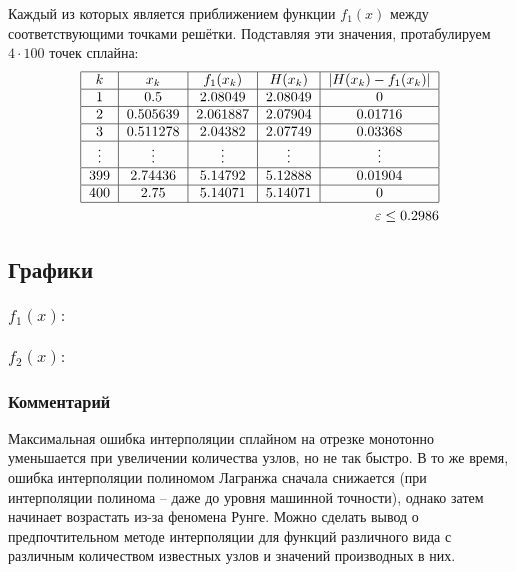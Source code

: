 Каждый из которых является приближением функции $f_1(x)$ между соответствующими точками решётки. Подставляя эти значения, протабулируем $4\cdot100$ точек сплайна:
\begin{align}
    \begin{tabular}{|c|c|c|c|c|}
        \hline
        $k$ & $x_k$ & $f_1(x_k)$ & $H(x_k)$ & $|H(x_k)-f_1(x_k)|$ \\
        \hline
        1 & 0.5      & 2.08049 & 2.08049 & 0 \\
        \hline
        2 & 0.505639 & 2.061887& 2.07904 &  0.01716 \\
        \hline
        3 & 0.511278 & 2.04382 & 2.07749 &  0.03368 \\
        \hline
        $\vdots$ & $\vdots$ & $\vdots$ & $\vdots$ &  $\vdots$ \\
        \hline
        399 & 2.74436   & 5.14792 &	5.12888 &  0.01904 \\
        \hline
        400 & 2.75 & 5.14071  & 5.14071 &  0\\
        \hline
    \end{tabular}\\
    \varepsilon \le 0.2986
\end{align}

\subsection{Графики}

\subsubsection{$f_1(x):$}


\subsubsection{$f_2(x):$}


\subsubsection*{Комментарий}
Максимальная ошибка интерполяции сплайном на отрезке монотонно уменьшается при увеличении количества узлов, но не так быстро. В то же время, ошибка интерполяции полиномом Лагранжа сначала снижается (при интерполяции полинома -- даже до уровня машинной точности), однако затем начинает возрастать из-за феномена Рунге. Можно сделать вывод о предпочтительном методе интерполяции для функций различного вида с различным количеством известных узлов и значений производных в них.

